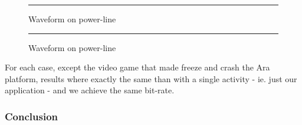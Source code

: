 \begin{figure}[h]
  \begin{minipage}[c]{.46\linewidth}
    \centering
    \label{fig:cpu-single}
    \rule{16em}{0.5pt}
    \caption[Waveform on power-linel]{Waveform on power-line}
  \end{minipage}
  \hfill%
  \begin{minipage}[c]{.46\linewidth}
  \centering
    \label{fig:cpu-load}
    \rule{16em}{0.5pt}
    \caption[Waveform on power-linel]{Waveform on power-line}
  \end{minipage}
\end{figure}

For each case, except the video game that made freeze and crash the Ara platform, results where exactly the same than with a single activity - ie. just our application - and we achieve the same bit-rate.

\subsubsection{Conclusion}



